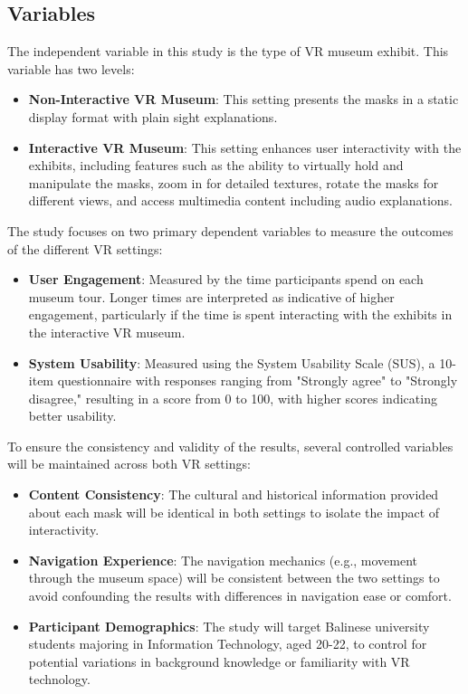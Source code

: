 \documentclass[conference]{IEEEtran}
\begin{document}
\subsection{Variables}
The independent variable in this study is the type of VR museum exhibit. This variable has two levels:

\begin{itemize}
    \item \textbf{Non-Interactive VR Museum}: This setting presents the masks in a static display format with plain sight explanations.
    \item \textbf{Interactive VR Museum}: This setting enhances user interactivity with the exhibits, including features such as the ability to virtually hold and manipulate the masks, zoom in for detailed textures, rotate the masks for different views, and access multimedia content including audio explanations.
\end{itemize}

The study focuses on two primary dependent variables to measure the outcomes of the different VR settings:

\begin{itemize}
    \item \textbf{User Engagement}: Measured by the time participants spend on each museum tour. Longer times are interpreted as indicative of higher engagement, particularly if the time is spent interacting with the exhibits in the interactive VR museum.
    \item \textbf{System Usability}: Measured using the System Usability Scale (SUS), a 10-item questionnaire with responses ranging from "Strongly agree" to "Strongly disagree," resulting in a score from 0 to 100, with higher scores indicating better usability.
\end{itemize}

To ensure the consistency and validity of the results, several controlled variables will be maintained across both VR settings:

\begin{itemize}
    \item \textbf{Content Consistency}: The cultural and historical information provided about each mask will be identical in both settings to isolate the impact of interactivity.
    \item \textbf{Navigation Experience}: The navigation mechanics (e.g., movement through the museum space) will be consistent between the two settings to avoid confounding the results with differences in navigation ease or comfort.
    \item \textbf{Participant Demographics}: The study will target Balinese university students majoring in Information Technology, aged 20-22, to control for potential variations in background knowledge or familiarity with VR technology.
\end{itemize}
\end{document}

